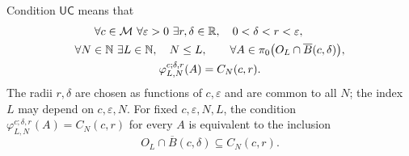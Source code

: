 \begin{definition}
\label{def:uniform-component-control}
Condition \(\mathsf{UC}\) means that
\begin{equation}
 \begin{gathered}
 \forall c\in\mathcal M\ \forall\varepsilon>0\
 \exists r,\delta\in\mathbb R,\quad 0<\delta<r<\varepsilon,\qquad\\
 \forall N\in\mathbb N\ \exists L\in\mathbb N,\quad N\le L,\qquad
 \forall A\in\pi_0\bigl(O_L\cap\overline B(c,\delta)\bigr),\\
 \varphi_{L,N}^{c;\delta,r}(A)=C_N(c,r).
 \end{gathered}
 \label{eq:uniform-component-control}
\end{equation}
The radii \(r,\delta\) are chosen as functions of \(c,\varepsilon\) and
are common to all \(N\); the index \(L\) may depend on
\(c,\varepsilon,N\). For fixed \(c,\varepsilon,N,L\), the condition
\(\varphi_{L,N}^{c;\delta,r}(A)=C_N(c,r)\) for every \(A\) is equivalent
to the inclusion
\[
 O_L\cap\overline B(c,\delta)\subseteq C_N(c,r).
\]
\end{definition}

